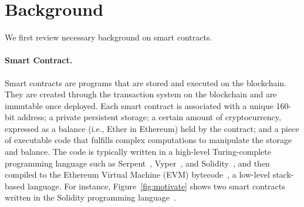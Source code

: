 \section{Background}\label{sec:background}
We first review necessary background on smart contracts.



\paragraph{Smart Contract.}Smart contracts are programs that are stored and
executed on the blockchain. They are created through the transaction system on
the blockchain and are immutable once deployed. Each smart contract is
associated with a unique 160-bit address; a private persistent storage; a
certain amount of cryptocurrency, expressed as a balance (i.e., Ether in
Ethereum) held by the contract; and a piece of executable code that fulfills
complex computations to manipulate the storage and balance. The code is
typically written in a high-level Turing-complete programming language such as
Serpent~\cite{serpent}, Vyper~\cite{vyper}, and Solidity~\cite{solidity}, and
then compiled to the Ethereum Virtual Machine (EVM) bytecode~\cite{yellowpaper},
a low-level stack-based language. For instance, Figure~\ref{fig:motivate} shows
two smart contracts written in the Solidity programming language~\cite{solidity}.

